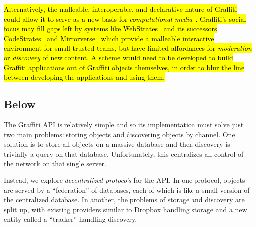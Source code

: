 \hl{%
Alternatively, the malleable, interoperable, and declarative nature of
Graffiti could allow it to serve as a new basis for \emph{computational media}~{\cite{computationalmedia}}.
Graffiti's social focus may fill gaps left by
systems like WebStrates~{\cite{webstrates}} and its successors CodeStrates~{\cite{codestrates}}
and Mirrorverse~{\cite{mirrorverse}} which provide a malleable interactive environment
for small trusted teams, but have limited affordances
for \emph{moderation} or \emph{discovery} of new content.
A scheme would need to be developed to build Graffiti applications out of
Graffiti objects themselves, in order to blur the line between developing
the applications and using them.
}%

\subsection{Below}

The Graffiti API is relatively simple
and so its implementation must solve just two main problems:
storing objects and discovering objects by channel.
One solution is to store all objects on a massive database
and then discovery is trivially a query on that database.
Unfortunately, this centralizes all control of the network
on that single server.

Instead, we explore \emph{decentralized protocols} for the API.
In one protocol, objects are served by a ``federation'' of databases,
each of which is like a small version of the centralized database.
In another, the problems of storage and discovery are split up,
with existing providers similar to Dropbox handling storage
and a new entity called a ``tracker'' handling discovery.

